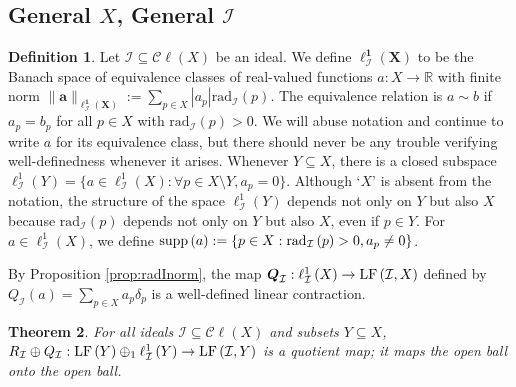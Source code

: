 \documentclass[12pt]{amsart}
\newtheorem{theorem}{Theorem}[section]
\theoremstyle{definition}
\newtheorem{definition}[theorem]{Definition}
\numberwithin{equation}{section}
\def \R {\mathbb{R}}
\def \I {\mathcal{I}}
\def \sbs {\subseteq}
\newcommand{\Cl}[1]{\mathcal{C}\ell\left(#1\right)}
\renewcommand{\l}[2]{\ell^1_{#1}\left( #2 \right)}
\newcommand{\rad}[2]{\mathrm{rad}_{#1}\left(#2\right)}
\begin{document}
\subsection{General $X$, General $\I$}
\begin{definition}
Let $\I \sbs \Cl{X}$ be an ideal. We define $\boldsymbol{\l{\I}{X}}$ to be the Banach space of equivalence classes of real-valued functions $a: X \to \R$ with finite norm $\boldsymbol{\|a\|_{\l{\I}{X}}} := \sum_{p \in X} |a_p|\rad{\I}{p}$. The equivalence relation is $a \sim b$ if $a_p = b_p$ for all $p \in X$ with $\rad{\I}{p} > 0$. We will abuse notation and continue to write $a$ for its equivalence class, but there should never be any trouble verifying well-definedness whenever it arises. Whenever $Y \sbs X$, there is a closed subspace $\l{\I}{Y} = \{a \in \l{\I}{X}: \forall p \in X \setminus Y, a_p = 0\}$. Although `$X$' is absent from the notation, the structure of the space $\l{\I}{Y}$ depends not only on $Y$ but also $X$ because $\rad{\I}{p}$ depends not only on $Y$ but also $X$, even if $p \in Y$. For $a \in \l{\I}{X}$, we define $\supp{a} := \{p \in X: \rad{\I}{p} > 0, a_p \neq 0\}$.

By Proposition \ref{prop:radInorm}, the map $\boldsymbol{Q}_\I: \l{\I}{X} \to \LF{\I}{X}$ defined by $Q_\I(a) = \sum_{p \in X} a_p\delta_p$ is a well-defined linear contraction.
\end{definition}

\begin{theorem} \label{thm:quotient}
For all ideals $\I \sbs \Cl{X}$ and subsets $Y \sbs X$, $R_{\I} \oplus Q_{\I}: \LF{Y} \oplus_1 \l{\I}{Y} \to \LF{\I,Y}$ is a quotient map; it maps the open ball onto the open ball.
\end{theorem}
\end{document}
